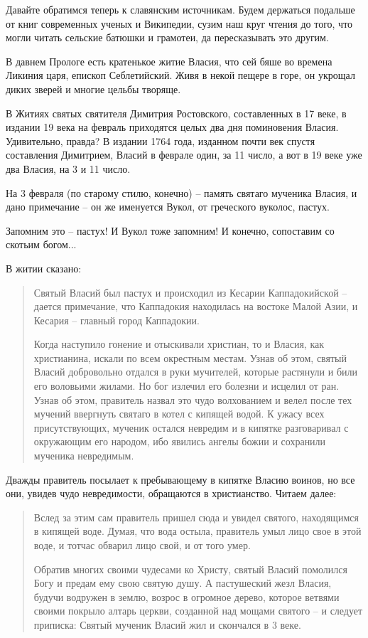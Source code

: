    Давайте обратимся теперь к славянским источникам. Будем держаться подальше от книг современных ученых и Википедии, сузим наш круг чтения до того, что могли читать сельские батюшки и грамотеи, да пересказывать это другим.

   В давнем Прологе есть кратенькое житие Власия, что сей бяше во времена Ликиния царя, епископ Себлетийский. Живя в некой пещере в горе, он укрощал диких зверей и многие цельбы творяще.

   В Житиях святых святителя Димитрия Ростовского, составленных в 17 веке, в издании 19 века на февраль приходятся целых два дня поминовения Власия. Удивительно, правда? В издании 1764 года, изданном почти век спустя составления Димитрием, Власий в феврале один, за 11 число, а вот в 19 веке уже два Власия, на 3 и 11 число.

   На 3 февраля (по старому стилю, конечно) – память святаго мученика Власия, и дано примечание – он же именуется Вукол, от греческого вуколос, пастух.

   Запомним это – пастух! И Вукол тоже запомним! И конечно, сопоставим со скотьим богом...

   В житии сказано:

\begin{quotation}
Святый Власий был пастух и происходил из Кесарии Каппадокийской – дается примечание, что Каппадокия находилась на востоке Малой Азии, и Кесария – главный город Каппадокии.

   Когда наступило гонение и отыскивали христиан, то и Власия, как христианина, искали по всем окрестным местам. Узнав об этом, святый Власий добровольно отдался в руки мучителей, которые растянули и били его воловьими жилами. Но бог излечил его болезни и исцелил от ран. Узнав об этом, правитель назвал это чудо волхованием и велел после тех мучений ввергнуть святаго в котел с кипящей водой. К ужасу всех присутствующих, мученик остался невредим и в кипятке разговаривал с окружающим его народом, ибо явились ангелы божии и сохранили мученика невредимым. 
\end{quotation}

Дважды правитель посылает к пребывающему в кипятке Власию воинов, но все они, увидев чудо невредимости, обращаются в христианство. Читаем далее:

\begin{quotation}
Вслед за этим сам правитель пришел сюда и увидел святого, находящимся в кипящей воде. Думая, что вода остыла, правитель умыл лицо свое в этой воде, и тотчас обварил лицо свой, и от того умер.

   Обратив многих своими чудесами ко Христу, святый Власий помолился Богу и предам ему свою святую душу. А пастушеский жезл Власия, будучи водружен в землю, возрос в огромное дерево, которое ветвями своими покрыло алтарь церкви, созданной над мощами святого – и следует приписка: Святый мученик Власий жил и скончался в 3 веке.
\end{quotation}

